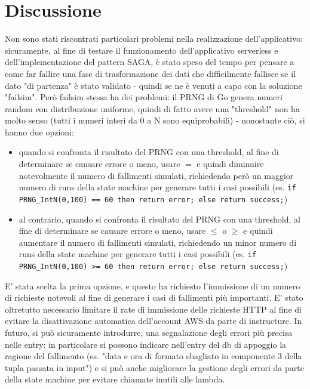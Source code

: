 \documentclass[
    sigconf, 
    screen=false, 
    acmthm=false, 
    nonacm
]{acmart}
\begin{document}
\section{Discussione}
Non sono stati riscontrati particolari problemi nella realizzazione dell'applicativo:
sicuramente, al fine di testare il funzionamento dell'applicativo serverless e dell'implementazione del pattern
SAGA, è stato speso del tempo per pensare a come far fallire una fase di trasformazione dei dati che difficilmente
fallisce se il dato "di partenza" è stato validato - quindi se ne è venuti a capo con la soluzione "failsim".
Però failsim stessa ha dei problemi: il PRNG di Go genera numeri random con distribuzione uniforme, quindi di
fatto avere una "threshold" non ha molto senso (tutti i numeri interi da 0 a N sono equiprobabili) - nonostante ciò, si hanno due opzioni:
\begin{itemize}
    \item quando si confronta il risultato del PRNG con una threshold, al fine di determinare se causare errore o 
    meno, usare $=$ e quindi diminuire notevolmente
    il numero di fallimenti simulati, richiedendo però un maggior numero di runs della state machine per generare
    tutti i casi possibili (es. \texttt{if PRNG\_IntN(0,100) == 60 then return error; else return success;})

    \item al contrario, quando si confronta il risultato del PRNG con una threshold, al fine di determinare se causare errore o 
    meno, usare $\leq$ o $\geq$ e quindi aumentare il numero di fallimenti simulati, richiedendo un minor numero di
    runs della state machine per generare tutti i casi possibili (es. \texttt{if PRNG\_IntN(0,100) >= 60 then return error; else return success;})
\end{itemize}
E' stata scelta la prima opzione, e questo ha richiesto l'immissione di un numero di richieste notevoli al fine di
generare i casi di fallimenti più importanti.
E' stato oltretutto necessario limitare il rate di immissione delle richieste HTTP al fine di evitare la disattivazione automatica
dell'account AWS da parte di instructure.
In futuro, si può sicuramente introdurre, una segnalazione degli errori più precisa nelle entry: in particolare si
possono indicare nell'entry del db di appoggio la ragione del fallimento (es. "data e ora di formato sbagliato in componente
3 della tupla passata in input") e si può anche migliorare la gestione degli errori da parte della state machine
per evitare chiamate inutili alle lambda.
\end{document}
